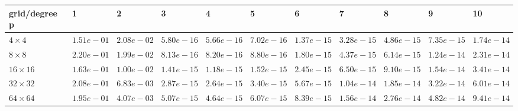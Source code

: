 \begin{tabular}{lllllllllll}
\hline
 grid/degree p   & 1          & 2          & 3          & 4          & 5          & 6          & 7          & 8          & 9          & 10         \\
\hline
 $4 \times 4$    & $1.51e-01$ & $2.08e-02$ & $5.80e-16$ & $5.66e-16$ & $7.02e-16$ & $1.37e-15$ & $3.28e-15$ & $4.86e-15$ & $7.35e-15$ & $1.74e-14$ \\
 $8 \times 8$    & $2.20e-01$ & $1.99e-02$ & $8.13e-16$ & $8.20e-16$ & $8.80e-16$ & $1.80e-15$ & $4.37e-15$ & $6.14e-15$ & $1.24e-14$ & $2.31e-14$ \\
 $16 \times 16$  & $1.63e-01$ & $1.00e-02$ & $1.41e-15$ & $1.18e-15$ & $1.52e-15$ & $2.45e-15$ & $6.50e-15$ & $9.10e-15$ & $1.54e-14$ & $3.41e-14$ \\
 $32 \times 32$  & $2.08e-01$ & $6.83e-03$ & $2.87e-15$ & $2.64e-15$ & $3.40e-15$ & $5.67e-15$ & $1.04e-14$ & $1.85e-14$ & $3.22e-14$ & $6.01e-14$ \\
 $64 \times 64$  & $1.95e-01$ & $4.07e-03$ & $5.07e-15$ & $4.64e-15$ & $6.07e-15$ & $8.39e-15$ & $1.56e-14$ & $2.76e-14$ & $4.82e-14$ & $9.41e-14$ \\
\hline
\end{tabular}